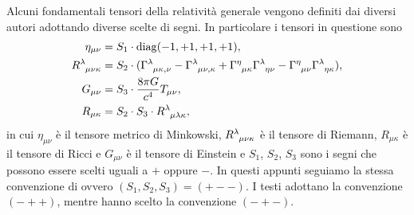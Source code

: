 Alcuni fondamentali tensori della relatività generale vengono definiti dai
diversi autori adottando diverse scelte di segni.  In particolare i tensori in
questione sono
\begin{subequations}
  \label{eq:convenzione-segni}
  \begin{align}
    \eta_{\mu\nu} &= S_{1} \cdot \diag(-1,+1,+1,+1), \\
    \tensor{R}{^{\lambda}_{\mu\nu\kappa}} &= S_{2} \cdot
    (\tensor{\Gamma}{^{\lambda}_{\mu\kappa,\nu}} -
    \tensor{\Gamma}{^{\lambda}_{\mu\nu,\kappa}} +
    \tensor{\Gamma}{^{\eta}_{\mu\kappa}} \tensor{\Gamma}{^{\lambda}_{\eta\nu}} -
    \tensor{\Gamma}{^{\eta}_{\mu\nu}}
    \tensor{\Gamma}{^{\lambda}_{\eta\kappa}}), \\
    G_{\mu\nu} &= S_{3} \cdot \frac{8\pi G}{c^{4}} T_{\mu\nu}, \\
    R_{\mu\kappa} &= S_{2} \cdot S_{3} \cdot
    \tensor{R}{^{\lambda}_{\mu\lambda\kappa}},
  \end{align}
\end{subequations}
in cui $\eta_{\mu\nu}$ è il tensore metrico di Minkowski,
$\tensor{R}{^{\lambda}_{\mu\nu\kappa}}$ è il tensore di Riemann, $R_{\mu\kappa}$
è il tensore di Ricci e $G_{\mu\nu}$ è il tensore di Einstein e $S_{1}$,
$S_{2}$, $S_{3}$ sono i segni che possono essere scelti uguali a $+$ oppure $-$.
In questi appunti seguiamo la stessa convenzione di
\textcite{weinberg:gravitation} ovvero $(S_{1}, S_{2}, S_{3}) = (+--)$.  I testi
\textcites{barone:relativita,landau:campi} adottano la convenzione $(-++)$,
mentre \textcite{ohanian:gravitazione} hanno scelto la convenzione $(-+-)$.

